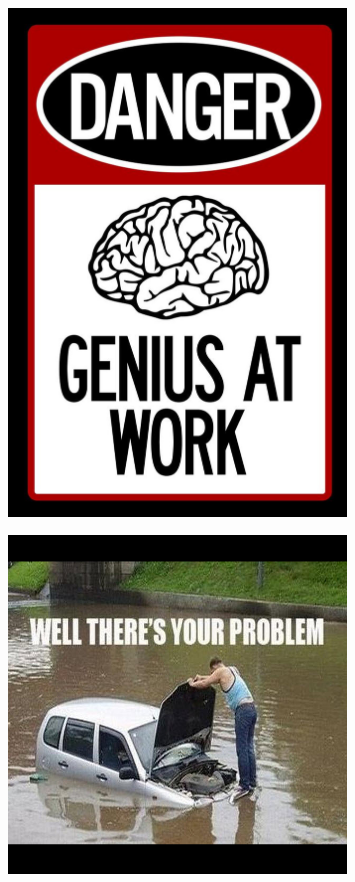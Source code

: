 \documentclass[a4paper]{article}
\begin{document}
\begin{figure}[htbp]
\centering
\includegraphics[width=0.8\textwidth]{meme-danger-genius.jpg}

\label{fig:meme-danger-genius}
\end{figure}

\begin{figure}[htbp]
\centering
\includegraphics[width=0.8\textwidth]{meme-problem.jpg}

\label{fig:meme-problem}
\end{figure}
\end{document}
